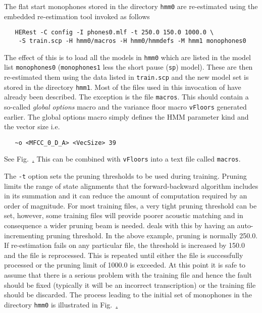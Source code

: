 The flat start monophones stored in the directory \texttt{hmm0} are
re-estimated using the embedded re-estimation 
tool 
invoked as follows
\begin{verbatim}
   HERest -C config -I phones0.mlf -t 250.0 150.0 1000.0 \
    -S train.scp -H hmm0/macros -H hmm0/hmmdefs -M hmm1 monophones0
\end{verbatim}
The effect of this is to load all the models in \texttt{hmm0} which are
listed in
the model list \texttt{monophones0} (\texttt{monophones1} less the short 
pause (\texttt{sp}) model). These are then re-estimated them using the data
listed in \texttt{train.scp} and the new model set is stored in the
directory \texttt{hmm1}.
Most of the files used in this invocation of  have 
already been described.  The exception is the file \texttt{macros}.
This should contain a so-called \textit{global options} macro and
the variance floor macro \texttt{vFloors} generated earlier.  The global options macro
simply defines the HMM parameter kind and the vector size i.e.
\begin{verbatim}
   ~o <MFCC_0_D_A> <VecSize> 39
\end{verbatim}
See Fig.~\href{f:MMFeg}. This can be combined with \texttt{vFloors} into a text file
called \texttt{macros}.


The \texttt{-t} option sets the pruning thresholds to be used during
training.  Pruning limits the range of state alignments that the
forward-backward algorithm includes in its summation and it
can reduce the amount of computation required by an
order of magnitude.  For most training files, a very tight pruning threshold
can be set, however, some training files will provide poorer acoustic
matching and in consequence a wider pruning beam is needed.  
deals with this by having an auto-incrementing pruning threshold.  In the
above example, pruning is normally 250.0.  If re-estimation fails on any
particular file, the threshold is increased by 150.0 and the file is
reprocessed.  This is repeated until either the file is successfully
processed or the pruning limit of 1000.0 is exceeded.  At this point it 
is safe to assume that there
is a serious problem with the training file and hence the fault should be fixed
(typically it will be an incorrect transcription) or the training file should be discarded.
The process leading to the initial set of monophones in the directory
\texttt{hmm0} is illustrated in Fig.~\href{f:step6}.

